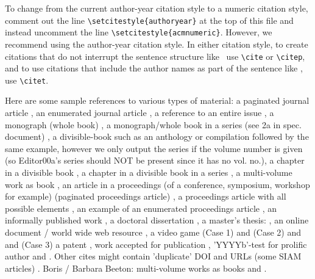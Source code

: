 \documentclass[format=acmsmall, review=false]{acmart}
\begin{document}
To change from the current author-year citation style to a numeric citation style, comment out the line \verb|\setcitestyle{authoryear}| at the top of this file and instead uncomment the line \verb|\setcitestyle{acmnumeric}|. However, we recommend using the author-year citation style. In either citation style, to create citations that do not interrupt the sentence structure like~\cite{Abril07} use \verb|\cite| or \verb|\citep|, and to use citations that include the author names as part of the sentence like \citet{Abril07}, use \verb|\citet|.

Here are some sample references to various types of material: a paginated journal article \cite{Abril07}, an enumerated
journal article \cite{Cohen07}, a reference to an entire issue \cite{JCohen96},
a monograph (whole book) \cite{Kosiur01}, a monograph/whole book in a series (see 2a in spec. document)
\cite{Harel79}, a divisible-book such as an anthology or compilation \cite{Editor00}
followed by the same example, however we only output the series if the volume number is given
\cite{Editor00a} (so Editor00a's series should NOT be present since it has no vol. no.),
a chapter in a divisible book \cite{Spector90}, a chapter in a divisible book
in a series \cite{Douglass98}, a multi-volume work as book \cite{Knuth97},
an article in a proceedings (of a conference, symposium, workshop for example)
(paginated proceedings article) \cite{Andler79}, a proceedings article
with all possible elements \cite{Smith10}, an example of an enumerated
proceedings article \cite{VanGundy07},
an informally published work \cite{Harel78}, a doctoral dissertation \cite{Clarkson85},
a master's thesis: \cite{anisi03}, an online document / world wide web
resource \cite{Thornburg01, Ablamowicz07, Poker06}, a video game (Case 1) \cite{Obama08} and (Case 2) \cite{Novak03}
and \cite{Lee05} and (Case 3) a patent \cite{JoeScientist001},
work accepted for publication \cite{rous08}, 'YYYYb'-test for prolific author
\cite{SaeediMEJ10} and \cite{SaeediJETC10}. Other cites might contain
'duplicate' DOI and URLs (some SIAM articles) \cite{Kirschmer:2010:AEI:1958016.1958018}.
Boris / Barbara Beeton: multi-volume works as books
\cite{MR781536} and \cite{MR781537}.

%
%
%
%
%
\end{document}
